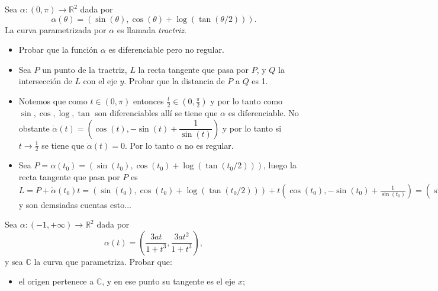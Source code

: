 \documentclass[11pt]{article}
\newcommand{\C}{\mathbb{C}}
\newcommand{\R}{{\mathbb{R}}}
\newenvironment{proof}[1][Demostraci\'on]{\begin{trivlist}
		\item[\hskip \labelsep {\bfseries #1}]}{\end{trivlist}}
\begin{document}
\begin{enumerate}
\begin{proof}
	\end{proof}
	
	\item Sea $\alpha:(0,\pi)\to\R^2$ dada por 
	\[
	\alpha(\theta)=(\sin(\theta),\cos(\theta)+\log(\tan(\theta/2))).
	\]
	La curva parametrizada por $\alpha$ es llamada \emph{tractriz}.

	\begin{itemize}
		\item Probar que la funci\'on $\alpha$ es diferenciable pero no regular.
		
		\item Sea $P$ un punto de la tractriz, $L$ la recta tangente que pasa por $P$, y $Q$ la
		intersecci\'on de $L$ con el eje $y$. Probar que la distancia de $P$ a $Q$ es 1.
	\end{itemize}


	\label{Ejercicio 2}

	\begin{proof}
	
		\begin{itemize}
			
			\item Notemos que como $t \in (0,\pi)$ entonces $\frac{t}{2} \in (0, \frac{\pi}{2})$ y por lo tanto como $\sin,\cos,\log,\tan$ son diferenciables all\'i se tiene que $\alpha$ es diferenciable. No obstante $\dot{\alpha}(t) = \left( \cos(t) , - \sin(t) + \dfrac{1}{\sin(t)} \right)$ y por lo tanto si $t \rightarrow \frac{1}{2}$ se tiene que $\dot{\alpha}(t) = 0$. Por lo tanto $\alpha$ no es regular.
			
			\item Sea $P = \alpha(t_0) = (\sin(t_0),\cos(t_0)+\log(\tan(t_0/2)))$, luego la recta tangente que pasa por $P$ es $L = P + \dot{\alpha}(t_0)t = (\sin(t_0),\cos(t_0)+\log(\tan(t_0/2))) + t (\cos(t_0) , - \sin(t_0) + \frac{1}{\sin(t_0)}) = (\sin(t_0) + t \cos(t_0), \cos(t_0)+\log(\tan(t_0/2)) - t ( - \sin(t_0) + \frac{1}{\sin(t_0)}) )$ y son demsiadas cuentas esto...
			
		\end{itemize}
	
	\end{proof}
	
	\item Sea $\alpha:(-1,+\infty )\to \R^2$ dada por
	\[
	\alpha(t) = \left(\frac{3at}{1+t^3},\frac{3at^2}{1+t^3}\right),
	\]
	y sea $\C$ la curva que parametriza. Probar que:
	\begin{itemize}
		\item el origen pertenece a $\C$, y en ese punto su tangente es el eje $x$;
		

\end{itemize}
\end{enumerate}
\end{document}
